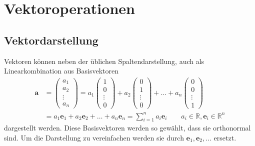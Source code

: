 \section{Vektoroperationen\label{clifford:section:Vektoroperationen}}
\subsection{Vektordarstellung\label{clifford:section:Vektordarstellung}}
Vektoren können neben der üblichen Spaltendarstellung, auch als Linearkombination aus Basisvektoren
\begin{equation}
    \begin{split}
    \textbf{a} 
    &=
    \begin{pmatrix} 
    a_1 \\ a_2 \\ \vdots \\ a_n   
    \end{pmatrix} 
    =
    a_1 \begin{pmatrix}
    1 \\ 0 \\ \vdots \\ 0  
    \end{pmatrix} 
    + 
    a_2\begin{pmatrix} 
    0 \\ 1 \\ \vdots \\ 0  
    \end{pmatrix} + \dots 
    + 
    a_n\begin{pmatrix}
    0 \\ 0 \\ \vdots \\ 1  
    \end{pmatrix} \\\ 
    &= 
    a_1\textbf{e}_1 
    +
    a_2\textbf{e}_2
    + 
    \dots + a_n\textbf{e}_n
    = 
    \sum_{i=1}^{n} a_i \textbf{e}_i
    \qquad
    a_i \in \mathbb{R}
    , \textbf{e}_i \in \mathbb{R}^n
    \end{split}
\end{equation}
dargestellt werden.
Diese Basisvektoren werden so gewählt, dass sie orthonormal sind. 
Um die Darstellung zu vereinfachen werden sie durch $\textbf{e}_1 , \textbf{e}_2, \dots$ ersetzt.
